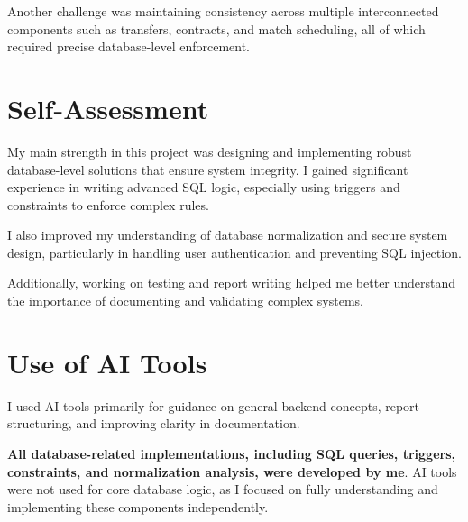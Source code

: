 \documentclass[12pt, a4paper]{article}
\begin{document}
Another challenge was maintaining consistency across multiple interconnected components such as transfers, contracts, and match scheduling, all of which required precise database-level enforcement.

\section*{Self-Assessment}

My main strength in this project was designing and implementing robust database-level solutions that ensure system integrity. I gained significant experience in writing advanced SQL logic, especially using triggers and constraints to enforce complex rules.

I also improved my understanding of database normalization and secure system design, particularly in handling user authentication and preventing SQL injection.

Additionally, working on testing and report writing helped me better understand the importance of documenting and validating complex systems.

\section*{Use of AI Tools}

I used AI tools primarily for guidance on general backend concepts, report structuring, and improving clarity in documentation.

\textbf{All database-related implementations, including SQL queries, triggers, constraints, and normalization analysis, were developed by me}. AI tools were not used for core database logic, as I focused on fully understanding and implementing these components independently.
\end{document}
